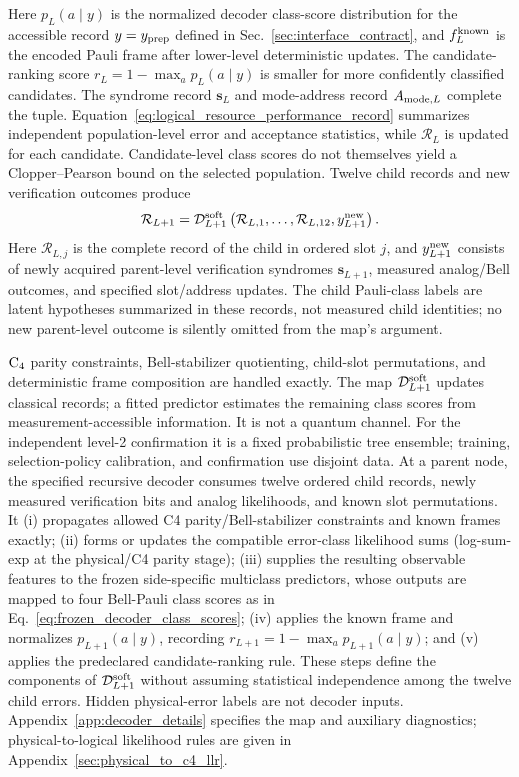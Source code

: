 \documentclass[aps,
prx,
superscriptaddress,
reprint,
longbibliography,
floatfix]{revtex4-2}
\begin{document}
Here $p_L(a\mid y)$ is the normalized decoder class-score distribution for the accessible record $y=y_{\rm prep}$ defined in Sec.~\ref{sec:interface_contract}, and $f_L^{\rm known}$ is the encoded Pauli frame after lower-level deterministic updates. The candidate-ranking score $r_L=1-\max_a p_L(a\mid y)$ is smaller for more confidently classified candidates. The syndrome record $\bm s_L$ and mode-address record $A_{{\rm mode},L}$ complete the tuple.
Equation~\eqref{eq:logical_resource_performance_record} summarizes independent population-level error and acceptance statistics, while $\mathcal R_L$ is updated for each candidate. Candidate-level class scores do not themselves yield a Clopper--Pearson bound on the selected population. Twelve child records and new verification outcomes produce
\begin{equation}
 \mathcal R_{L+1}
 =
 \mathcal D^{\rm soft}_{L+1}
 \left(
 \mathcal R_{L,1},\ldots,\mathcal R_{L,12},
 y_{L+1}^{\rm new}
 \right).
\label{eq:recursive_soft_decoder_map}
\end{equation}
Here $\mathcal R_{L,j}$ is the complete record of the child in ordered slot $j$, and $y_{L+1}^{\rm new}$ consists of newly acquired parent-level verification syndromes $\bm s_{L+1}$, measured analog/Bell outcomes, and specified slot/address updates. The child Pauli-class labels are latent hypotheses summarized in these records, not measured child identities; no new parent-level outcome is silently omitted from the map's argument.

${\rm C_4}$ parity constraints, Bell-stabilizer quotienting, child-slot permutations, and deterministic frame composition are handled exactly. The map $\mathcal D_{L+1}^{\rm soft}$ updates classical records; a fitted predictor estimates the remaining class scores from measurement-accessible information. It is not a quantum channel. For the independent level-2 confirmation it is a fixed probabilistic tree ensemble; training, selection-policy calibration, and confirmation use disjoint data.
At a parent node, the specified recursive decoder consumes twelve ordered child records, newly measured verification bits and analog likelihoods, and known slot permutations. It (i) propagates allowed C4 parity/Bell-stabilizer constraints and known frames exactly; (ii) forms or updates the compatible error-class likelihood sums (log-sum-exp at the physical/C4 parity stage); (iii) supplies the resulting observable features to the frozen side-specific multiclass predictors, whose outputs are mapped to four Bell-Pauli class scores as in Eq.~\eqref{eq:frozen_decoder_class_scores}; (iv) applies the known frame and normalizes $p_{L+1}(a\mid y)$, recording $r_{L+1}=1-\max_a p_{L+1}(a\mid y)$; and (v) applies the predeclared candidate-ranking rule. These steps define the components of $\mathcal D^{\rm soft}_{L+1}$ without assuming statistical independence among the twelve child errors. Hidden physical-error labels are not decoder inputs. Appendix~\ref{app:decoder_details} specifies the map and auxiliary diagnostics; physical-to-logical likelihood rules are given in Appendix~\ref{sec:physical_to_c4_llr}.
\end{document}
